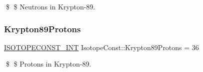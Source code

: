 \$ \$ Neutrons in Krypton-\/89. \mbox{\label{group___isotope_const-_krypton-_kr89_gaaacedd1d94d4d20ca6d428e715973489}} 
\subsubsection{\texorpdfstring{Krypton89\+Protons}{Krypton89Protons}}
{\footnotesize\ttfamily \mbox{\hyperlink{group___isotope_const-_macros_ga5f18360b3e99483a35c32d789e62621c}{I\+S\+O\+T\+O\+P\+E\+C\+O\+N\+S\+T\+\_\+\+I\+NT}} Isotope\+Const\+::\+Krypton89\+Protons = 36}

\$ \$ Protons in Krypton-\/89. 